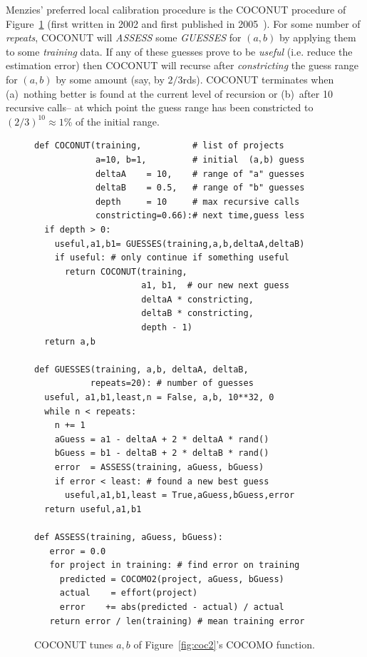 \documentclass{sig-alternate}
\newcommand{\fig}[1]{Figure~\ref{fig:#1}}
\begin{document}
Menzies' preferred local calibration procedure is the COCONUT
procedure of \fig{coconut} (first written in 2002
and first published in 2005~\cite{me04h}). 
For some number of {\em repeats},
COCONUT will {\em ASSESS} some {\em GUESSES} 
 for $(a,b)$ by applying them to some
{\em training} data. If any of these guesses prove to
be {\em useful} (i.e. reduce the estimation error) then COCONUT will recurse after
{\em constricting} the guess range for $(a,b)$ by some amount (say, by $2/3$rds). COCONUT terminates
when (a)~nothing better is found at the current level of recursion
or (b)~after 10 recursive calls-- at which point the guess range
has been constricted to  $(2/3)^{10}\approx 1$\% of the initial range.


\begin{figure}[!t]
\begin{lstlisting}
def COCONUT(training,          # list of projects
            a=10, b=1,         # initial  (a,b) guess
            deltaA    = 10,    # range of "a" guesses 
            deltaB    = 0.5,   # range of "b" guesses
            depth     = 10     # max recursive calls
            constricting=0.66):# next time,guess less
  if depth > 0:
    useful,a1,b1= GUESSES(training,a,b,deltaA,deltaB)
    if useful: # only continue if something useful
      return COCONUT(training, 
                     a1, b1,  # our new next guess
                     deltaA * constricting,
                     deltaB * constricting,
                     depth - 1)
  return a,b

def GUESSES(training, a,b, deltaA, deltaB,
           repeats=20): # number of guesses
  useful, a1,b1,least,n = False, a,b, 10**32, 0
  while n < repeats:
    n += 1
    aGuess = a1 - deltaA + 2 * deltaA * rand()
    bGuess = b1 - deltaB + 2 * deltaB * rand()
    error  = ASSESS(training, aGuess, bGuess)
    if error < least: # found a new best guess
      useful,a1,b1,least = True,aGuess,bGuess,error
  return useful,a1,b1

def ASSESS(training, aGuess, bGuess):
   error = 0.0
   for project in training: # find error on training
     predicted = COCOMO2(project, aGuess, bGuess)
     actual    = effort(project)
     error    += abs(predicted - actual) / actual
   return error / len(training) # mean training error
\end{lstlisting}
\caption{COCONUT  tunes  $a,b$ 
of \fig{coc2}'s COCOMO function.}\label{fig:coconut}
\end{figure}

 
\end{document}
